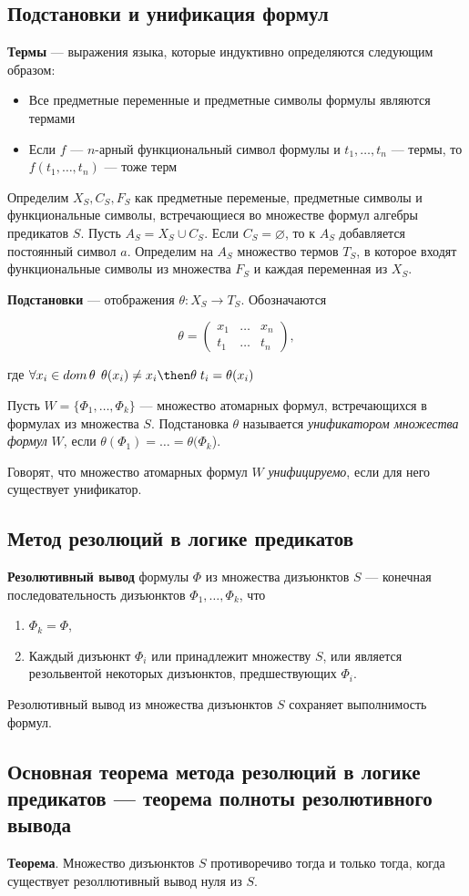 \subsection{Подстановки и унификация формул}
\dftion \textbf{Термы} --- выражения языка, которые индуктивно определяются следующим образом:

\begin{itemize}
    \item Все предметные переменные и предметные символы формулы являются термами
    \item Если $f$ --- $n$-арный функциональный символ формулы и $t_1, \dots, t_n$ --- термы, то $f(t_1,\dots,t_n)$ --- тоже терм
\end{itemize}

Определим $X_S, C_S, F_S$ как предметные переменые, предметные символы и функциональные символы, встречающиеся во множестве формул алгебры предикатов $S$. Пусть $A_S = X_S \cup C_S$. Если $C_S = \varnothing$, то к $A_S$ добавляется постоянный символ $a$. Определим на $A_S$ множество термов $T_S$, в которое входят функциональные символы из множества $F_S$ и каждая переменная из $X_S$.

\dftion \textbf{Подстановки} --- отображения $\theta: X_S \to T_S$. Обозначаются

$$\theta = \left(
\begin{matrix}
    x_1 & \dots & x_n \\
    t_1 & \dots & t_n
\end{matrix}
\right),$$

где $\forall x_i \in dom \, \theta \; \,  \theta(x_i) \neq x_i \then \theta \; t_i=\theta(x_i)$

Пусть $W=\{\Phi_1,\dots,\Phi_k\}$ --- множество атомарных формул, встречающихся в формулах из множества $S$. Подстановка $\theta$ называется \textit{унификатором множества формул} $W$, если $\theta(\Phi_1) = \dots = \theta(\Phi_k$).

Говорят, что множество атомарных формул $W$ \textit{унифицируемо}, если для него существует унификатор.
\subsection{Метод резолюций в логике предикатов}
\dftion \textbf{Резолютивный вывод} формулы $\Phi$ из множества дизъюнктов $S$ --- конечная последовательность дизъюнктов $\Phi_1, \dots, \Phi_k$, что

\begin{enumerate}
    \item $\Phi_k = \Phi$,
    \item Каждый дизъюнкт $\Phi_i$ или принадлежит множеству $S$, или является резольвентой некоторых дизъюнктов, предшествующих $\Phi_i$.
\end{enumerate}

Резолютивный вывод из множества дизъюнктов $S$ сохраняет выполнимость формул.
\subsection{Основная теорема метода резолюций в логике предикатов --- теорема полноты резолютивного вывода}
\textbf{Теорема}. Множество дизъюнктов $S$ противоречиво тогда и только тогда, когда существует резоллютивный вывод нуля из $S$.